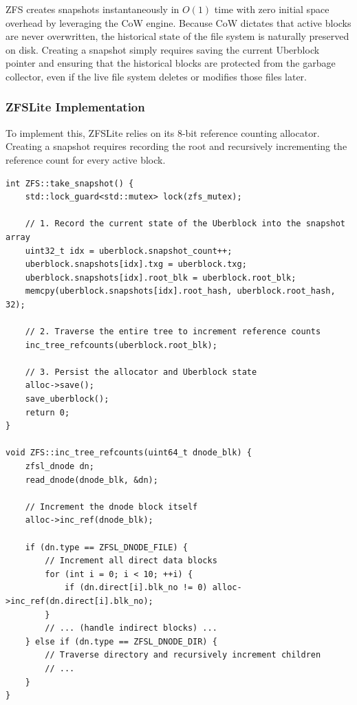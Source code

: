 \documentclass[pdflatex,sn-mathphys-num]{sn-jnl}
\begin{document}
ZFS creates snapshots instantaneously in $O(1)$ time with zero initial space overhead by leveraging the CoW engine. Because CoW dictates that active blocks are never overwritten, the historical state of the file system is naturally preserved on disk. Creating a snapshot simply requires saving the current Uberblock pointer and ensuring that the historical blocks are protected from the garbage collector, even if the live file system deletes or modifies those files later.

\subsubsection{ZFSLite Implementation}
To implement this, ZFSLite relies on its 8-bit reference counting allocator. Creating a snapshot requires recording the root and recursively incrementing the reference count for every active block.

\begin{lstlisting}[caption={Snapshot creation and reference counting mechanism.}, label={lst:snap}]
int ZFS::take_snapshot() {
    std::lock_guard<std::mutex> lock(zfs_mutex);
    
    // 1. Record the current state of the Uberblock into the snapshot array
    uint32_t idx = uberblock.snapshot_count++;
    uberblock.snapshots[idx].txg = uberblock.txg;
    uberblock.snapshots[idx].root_blk = uberblock.root_blk;
    memcpy(uberblock.snapshots[idx].root_hash, uberblock.root_hash, 32);

    // 2. Traverse the entire tree to increment reference counts
    inc_tree_refcounts(uberblock.root_blk);
    
    // 3. Persist the allocator and Uberblock state
    alloc->save();
    save_uberblock();
    return 0;
}

void ZFS::inc_tree_refcounts(uint64_t dnode_blk) {
    zfsl_dnode dn;
    read_dnode(dnode_blk, &dn);
    
    // Increment the dnode block itself
    alloc->inc_ref(dnode_blk);

    if (dn.type == ZFSL_DNODE_FILE) {
        // Increment all direct data blocks
        for (int i = 0; i < 10; ++i) {
            if (dn.direct[i].blk_no != 0) alloc->inc_ref(dn.direct[i].blk_no);
        }
        // ... (handle indirect blocks) ...
    } else if (dn.type == ZFSL_DNODE_DIR) {
        // Traverse directory and recursively increment children
        // ...
    }
}
\end{lstlisting}
\end{document}
